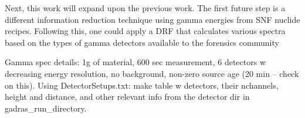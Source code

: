 Next, this work will expand upon the previous work.  The first future step is a
different information reduction technique using gamma energies from \gls{SNF}
nuclide recipes.  Following this, one could apply a \gls{DRF} that calculates
various spectra based on the types of gamma detectors available to the
forensics community 

Gamma spec details: 1g of material, 600 sec measurement, 6 detectors w decreasing 
energy resolution, no background, non-zero source age (20 min -- check on this).
Using DetectorSetups.txt: make table w detectors, their nchannels, height and distance,
and other relevant info from the detector dir in gadras\_run\_directory.
